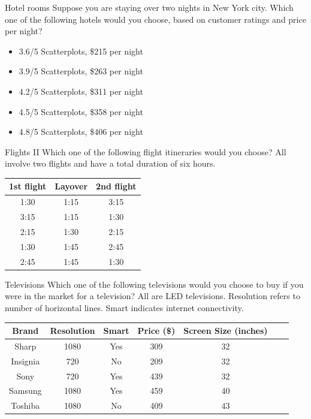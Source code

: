 \documentclass{beamer}
\begin{document}
\begin{frame}{Hotel rooms}
Suppose you are staying over two nights in New York city.
Which one of the following hotels would you choose, based on customer ratings and price per night?	

\begin{itemize}
	\item 3.6/5 Scatterplots, \$215 per night
	\item 3.9/5 Scatterplots, \$263 per night
	\item 4.2/5 Scatterplots, \$311 per night
	\item 4.5/5 Scatterplots, \$358 per night
	\item 4.8/5 Scatterplots, \$406 per night
\end{itemize}
\end{frame}

\begin{frame}{Flights II}
Which one of the following flight itineraries would you choose? All involve two
flights and have a total duration of six hours.

\vspace{0.5cm}
\begin{center}
\begin{tabular}{ccc}
\hline
	1st flight & Layover & 2nd flight \\ \hline
	1:30 & 1:15 & 3:15 \\ 
	3:15 & 1:15 & 1:30 \\ 
	2:15 & 1:30 & 2:15 \\ 
	1:30 & 1:45 & 2:45 \\ 
	2:45 & 1:45 & 1:30 \\ \hline
\end{tabular}
\end{center}
\end{frame}

\begin{frame}{Televisions}
Which one of the following televisions would you choose to buy if you
were in the market for a television? All are LED televisions. Resolution
refers to number of horizontal lines. Smart indicates internet connectivity.

\vspace{0.5cm}
\begin{center}
\begin{tabular}{ccccccc}
\hline
Brand & Resolution & Smart & Price (\$) & Screen Size (inches) &  \\ \hline
Sharp & 1080 & Yes & 309 & 32 &  \\ 
Insignia & 720 & No & 209 & 32 &  \\ 
Sony & 720 & Yes & 439 & 32 &  \\ 
Samsung & 1080 & Yes & 459 & 40 &  \\ 
Toshiba & 1080 & No & 409 & 43 &  \\
\hline
\end{tabular}
\end{center}
\end{frame}
\end{document}
